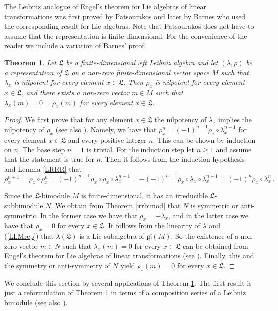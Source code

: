\documentclass{amsart}
\newtheorem{thm}{Theorem}[section]
\numberwithin{equation}{section}
\newcommand{\lf}{\mathfrak{L}}
\newcommand{\gl}{\mathfrak{gl}}
\begin{document}
The Leibniz analogue of Engel's theorem for Lie algebras of linear transformations was first
proved by Patsourakos \cite[Theorem 7]{P1} and later by Barnes \cite[Theorem 1.2]{B2}
who used the corresponding result for Lie algebras. Note that Patsourakos does not have
to assume that the representation is finite-dimensional. For the convenience of the reader
we include a variation of Barnes' proof.

\begin{thm}\label{ej}
Let $\lf$ be a finite-dimensional  left Leibniz algebra and let $(\lambda,\rho)$ be a representation
of $\lf$ on a non-zero finite-dimensional vector space $M$ such that $\lambda_x$ is nilpotent for
every element $x\in\lf$. Then $\rho_x$ is nilpotent for every element $x\in\lf$, and there exists
a non-zero vector $m\in M$ such that $\lambda_x(m)=0=\rho_x(m)$ for every element $x\in\lf$.
\end{thm}

\begin{proof} 
We first prove that for any element $x\in\lf$ the nilpotency of $\lambda_x$ implies the nilpotency
of $\rho_x$ (see also \cite[Lemma 6]{P1}). Namely, we have that $\rho_x^n=(-1)^{n-1}\rho_x
\circ\lambda_x^{n-1}$ for every element $x\in\lf$ and every positive integer $n$. This can be
shown by induction on $n$. The base step $n=1$ is trivial. For the induction step let $n\ge 1$
and assume that the statement is true for $n$. Then it follows from the induction hypothesis and 
Lemma \ref{LRRR} that $$\rho_x^{n+1}=\rho_x\circ\rho_x^n=(-1)^{n-1}\rho_x\circ\rho_x\circ
\lambda_x^{n-1}=-(-1)^{n-1}\rho_x\circ\lambda_x\circ\lambda_x^{n-1}=(-1)^n\rho_x\circ
\lambda_x^n\,.$$

Since the $\lf$-bimodule $M$ is finite-dimensional, it has an irreducible $\lf$-subbi\-module $N$.
We obtain from Theorem \ref{irrbimod} that $N$ is symmetric or anti-symmetric. In the former
case we have that $\rho_x=-\lambda_x$, and in the latter case we have that $\rho_x=0$ for
every $x\in\lf$. It follows from the linearity of $\lambda$ and (\ref{LLMrep}) that $\lambda(\lf)$
is a Lie subalgebra of $\gl(M)$. So the existence of a non-zero vector $m\in N$ such that
$\lambda_x(m)=0$ for every $x\in\lf$ can be obtained from Engel's theorem for Lie algebras
of linear transformations (see \cite[Theorem 3.3]{H}). Finally, this and the symmetry or
anti-symmetry of $N$ yield $\rho_x(m)=0$ for every $x\in\lf$.
\end{proof}

We conclude this section by several applications of Theorem \ref{ej}. The first result is just a
reformulation of Theorem \ref{ej} in terms of a composition series of a Leibniz bimodule (see also
\cite[Corollary 9]{P1}).
\end{document}
